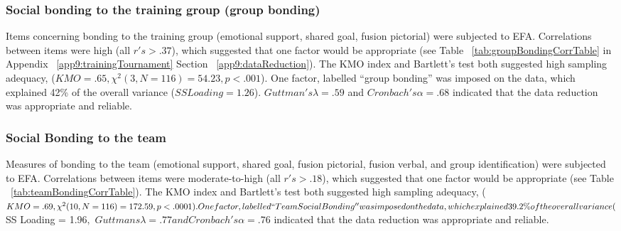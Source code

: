 
\subsubsection{Social bonding to the training group (group bonding)}
Items concerning bonding to the training group (emotional support, shared goal, fusion pictorial) were subjected to EFA.  Correlations between items were high (all $r's > .37$), which suggested that one factor would be appropriate (see Table ~\ref{tab:groupBondingCorrTable} in Appendix ~\ref{app9:trainingTournament} Section ~\ref{app9:dataReduction}). The KMO index and Bartlett's test both suggested high sampling adequacy, ($KMO =  .65, \chi^2(3, N = 116) = 54.23, p < .001$).
One factor, labelled ``group bonding'' was imposed on the data, which explained 42\% of the overall variance ($SS Loading = 1.26$). $Guttman's \lambda = .59$ and $Cronbach's \alpha = .68$ indicated that the data reduction was appropriate and reliable.

\subsubsection{Social Bonding to the team \label{app9:teamBondingEFA}}
Measures of bonding to the team (emotional support, shared goal, fusion pictorial, fusion verbal, and group identification) were subjected to EFA.  Correlations between items were moderate-to-high (all $r's > .18$), which suggested that one factor would be appropriate (see Table ~\ref{tab:teamBondingCorrTable}).
The KMO index and Bartlett's test both suggested high sampling adequacy, ($KMO = .69, \chi^2(10, N = 116) = 172.59, p < .0001).
One factor, labelled ``Team Social Bonding'' was imposed on the data, which explained 39.2\% of the overall variance ($SS Loading = 1.96$, $ $Guttmans \lambda = .77 and Cronbach's \alpha = .76$ indicated that the data reduction was appropriate and reliable.

